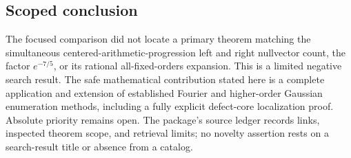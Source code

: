 \documentclass[11pt]{article}
\theoremstyle{definition}\newtheorem{definition}[theorem]{Definition}
\theoremstyle{remark}\newtheorem{remark}[theorem]{Remark}
\begin{document}
\subsection{Scoped conclusion}
The focused comparison did not locate a primary theorem matching the
simultaneous centered-arithmetic-progression left and right nullvector count,
the factor $e^{-7/5}$, or its rational all-fixed-orders expansion. This is a
limited negative search result. The safe mathematical contribution stated
here is a complete application and extension of established Fourier and
higher-order Gaussian enumeration methods, including a fully explicit
defect-core localization proof. Absolute priority remains open. The package's
source ledger records links, inspected theorem scope, and retrieval limits;
no novelty assertion rests on a search-result title or absence from a catalog.
\end{document}
